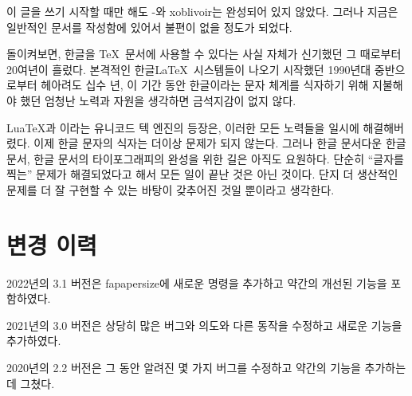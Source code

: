 \documentclass[
	12pt,
	a4paper,
	kosection,
	footnote,
	nobookmarks,
	microtype,
	figtabcapt,
]{oblivoir}
\newcommand\xobclass{x\-ob\-liv\-oir\oblivoirallowbreak}
\def\xetexko{\XeTeX-\ko}
\begin{document}
이 글을 쓰기 시작할 때만 해도 \xetexko{}와 \xobclass{}는
완성되어 있지 않았다. 그러나 지금은 일반적인 문서를 작성함에 있어서
불편이 없을 정도가 되었다.

\bigskip

돌이켜보면, 한글을 \TeX\ 문서에 사용할 수 있다는 사실 자체가
신기했던 그 때로부터 20여년이 흘렀다. 본격적인 한글\LaTeX\ 시스템들이
나오기 시작했던 1990년대 중반으로부터 헤아려도 십수 년,
이 기간 동안 한글이라는 문자 체계를 식자하기 위해 지불해야 했던
엄청난 노력과 자원을 생각하면 금석지감이 없지 않다.

Lua\TeX 과 \XeTeX 이라는 유니코드 텍 엔진의 등장은, 이러한 모든
노력들을 일시에 해결해버렸다. 이제 한글 문자의 식자는 더이상
문제가 되지 않는다.
그러나 한글 문서다운 한글 문서, 한글 문서의 타이포그래피의 완성을
위한 길은 아직도 요원하다. 단순히 “글자를 찍는” 문제가 해결되었다고
해서 모든 일이 끝난 것은 아닌 것이다. 단지 더 생산적인 문제를
더 잘 구현할 수 있는 바탕이 갖추어진 것일 뿐이라고 생각한다.


\section{변경 이력}


2022년의 3.1 버전은 fapapersize에 새로운 명령을 추가하고 약간의
개선된 기능을 포함하였다. 

\noindent
2021년의 3.0 버전은 상당히 많은 버그와 의도와 다른 동작을 수정하고 새로운 
기능을 추가하였다.

\noindent
2020년의 2.2 버전은 그 동안 알려진 몇 가지 버그를 수정하고 약간의 기능을
추가하는 데 그쳤다.




\end{document}
